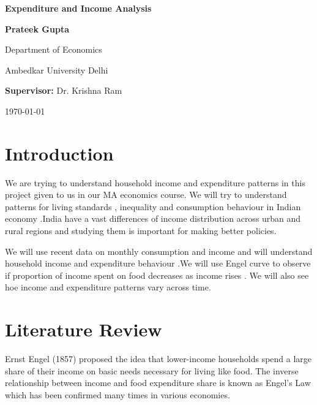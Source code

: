 \documentclass[12pt]{article}
\begin{document}
\begin{titlepage}
    \centering
    \vspace*{2cm}
    
    {\Huge\bfseries Expenditure and Income Analysis\par}
    \vspace{2cm}
    
    {\Large\bfseries Prateek Gupta\par}
    \vspace{0.5cm}
    
    {\large Department of Economics\par}
    \vspace{0.5cm}
    
    {\large Ambedkar University Delhi\par}
    \vspace{2cm}
    
    {\large\textbf{Supervisor:} Dr. Krishna Ram\par}
    \vfill
    
    {\large \today\par}
\end{titlepage}


\newpage
\tableofcontents

\newpage
\section{Introduction}
We are trying to understand household income and expenditure patterns in this project given to us in our MA economics course. We will try to understand patterns for living standards , inequality and consumption behaviour in Indian economy .India have a vast differences of income distribution across urban and rural regions and studying them is important for making better policies. 

We will use recent data on monthly consumption and income and will understand household income and expenditure behaviour .We will use Engel curve to observe if proportion of income spent on food decreases as income rises . We will also see hoe income and expenditure patterns vary across time.

\section{Literature Review}
Ernst Engel (1857) proposed the idea that lower-income households spend a large share of their income on basic needs necessary for living like food. The inverse relationship between income and food expenditure share is known as Engel’s Law which has been confirmed many times in various economies.
\end{document}
